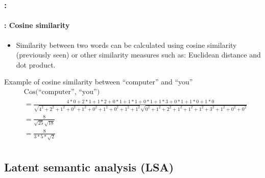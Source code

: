 \documentclass[xcolor=table]{beamer}
\begin{document}
\begin{frame}
	\frametitle{\insertshortsubtitle: \insertsection}
	\framesubtitle{\insertsubsection: Cosine similarity}

	\begin{itemize}
		\item Similarity between two words can be calculated using cosine similarity (previously seen) or other similarity measures such as: Euclidean distance and dot product.
	\end{itemize}
	
	\begin{exampleblock}{Example of cosine similarity between ``computer'' and ``you''}
		\fontsize{6}{16}\selectfont\bfseries\boldmath
		\begin{align*}
		& \text{Cos(``computer'', ``you'')} \\ 
		& = \frac{4*0 + 2*1 + 1*2 + 0*1 + 1*1 + 0*1 + 1*3 + 0*1 + 1*0 + 1*0}{\sqrt{4^2 + 2^2 + 1^2 + 0^2 + 1^2 + 0^2 + 1^2 + 0^2 + 1^2 + 1^2} \sqrt{0^2 + 1^2 + 2^2 + 1^2 + 1^2 + 1^2 + 3^2 + 1^2 + 0^2 + 0^2}}\\
		& = \frac{8}{\sqrt{25}\sqrt{18}}\\
		& = \frac{8}{3*5*\sqrt{2}}\\
		\end{align*}
	\end{exampleblock}

\end{frame}

\subsection{Latent semantic analysis (LSA)}
\end{document}
